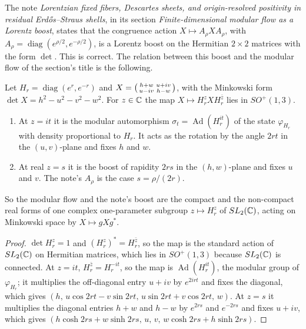 The note \emph{Lorentzian fixed fibers, Descartes sheets, and origin-resolved positivity in residual Erdős--Straus shells}, in its section \emph{Finite-dimensional modular flow as a Lorentz boost}, states that the congruence action $X\mapsto A_\rho XA_\rho$, with $A_\rho=\operatorname{diag}(e^{\rho/2},e^{-\rho/2})$, is a Lorentz boost on the Hermitian $2\times2$ matrices with the form $\det$. This is correct. The relation between this boost and the modular flow of the section's title is the following.

\begin{proposition}\label{prop:flowboost}
Let $H_r=\operatorname{diag}(e^r,e^{-r})$ and $X=\begin{psmallmatrix}h+w&u+iv\\u-iv&h-w\end{psmallmatrix}$, with the Minkowski form $\det X=h^2-u^2-v^2-w^2$. For $z\in\mathbb{C}$ the map $X\mapsto H_r^zXH_r^{\bar z}$ lies in $SO^+(1,3)$.
\begin{enumerate}[label=(\alph*)]
\item At $z=it$ it is the modular automorphism $\sigma_t=\operatorname{Ad}(H_r^{it})$ of the state $\varphi_{H_r}$ with density proportional to $H_r$. It acts as the rotation by the angle $2rt$ in the $(u,v)$-plane and fixes $h$ and $w$.
\item At real $z=s$ it is the boost of rapidity $2rs$ in the $(h,w)$-plane and fixes $u$ and $v$. The note's $A_\rho$ is the case $s=\rho/(2r)$.
\end{enumerate}
So the modular flow and the note's boost are the compact and the non-compact real forms of one complex one-parameter subgroup $z\mapsto H_r^z$ of $SL_2(\mathbb{C})$, acting on Minkowski space by $X\mapsto gXg^*$.
\end{proposition}
\begin{proof}
$\det H_r^z=1$ and $(H_r^z)^*=H_r^{\bar z}$, so the map is the standard action of $SL_2(\mathbb{C})$ on Hermitian matrices, which lies in $SO^+(1,3)$ because $SL_2(\mathbb{C})$ is connected. At $z=it$, $H_r^{\bar z}=H_r^{-it}$, so the map is $\operatorname{Ad}(H_r^{it})$, the modular group of $\varphi_{H_r}$; it multiplies the off-diagonal entry $u+iv$ by $e^{2irt}$ and fixes the diagonal, which gives $(h,\,u\cos2rt-v\sin2rt,\,u\sin2rt+v\cos2rt,\,w)$. At $z=s$ it multiplies the diagonal entries $h+w$ and $h-w$ by $e^{2rs}$ and $e^{-2rs}$ and fixes $u+iv$, which gives $(h\cosh2rs+w\sinh2rs,\,u,\,v,\,w\cosh2rs+h\sinh2rs)$.
\end{proof}

